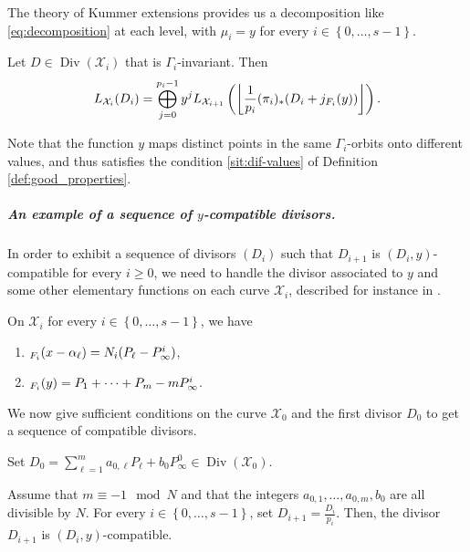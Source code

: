 \documentclass[a4paper,USenglish,autoref]{lipics-v2021}
\newcommand\floor[1]{\left\lfloor #1 \right\rfloor}
\DeclareMathOperator{\Div}{Div}
\let\div\relax\DeclareMathOperator{\div}{div}
\newcommand{\set}[1]{\left\{#1\right\}}
\newcommand{\range}[1]{\set{0,\dots,#1-1}}
\newcommand\calX{\mathcal{X}}
\begin{document}
The theory of Kummer extensions provides us a decomposition like \eqref{eq:decomposition} at each level, with $\mu_i=y$ for every $i\in\range{s}$.

\begin{theorem}[{\cite[Theorem 2.2]{M04}}]\label{th:M04}
	Let $D \in \Div(\calX_i)$ that is $\Gamma_i$-invariant. Then 
	\[L_{\calX_i}(D_i)=\bigoplus_{j=0}^{p_i-1}y^j L_{\calX_{i+1}}\left(\floor{\frac{1}{p_i}(\pi_i)_*(D_i+j\div_{F_i}(y))}\right).\]
\end{theorem}

Note that the function $y$ maps distinct points in the same $\Gamma_i$-orbits onto different values, and thus satisfies the condition \ref{sit:dif-values} of Definition \ref{def:good_properties}.

\subparagraph*{An example of a sequence of $y$-compatible divisors.}

In order to exhibit a sequence of divisors $(D_i)$ such that $D_{i+1}$ is $(D_i,y)$-compatible for every $i \geq 0$, we need to handle the divisor associated to $y$ and some other elementary functions on each curve $\calX_i$, described for instance in \cite{MQS15}.

\begin{lemma}
	On $\calX_i$ for every $i \in \range{s}$, we have
	\begin{enumerate}
		\item $\div_{F_i}(x-\alpha_\ell)=N_i(P_\ell-P^i_\infty)$,
		\item $\div_{F_i}(y)=P_1+\dots+P_m - m P_\infty^i$.
	\end{enumerate}  
\end{lemma}

We now give sufficient conditions on the curve $\calX_0$ and the first divisor $D_0$ to get a sequence of compatible divisors.

\begin{lemma}\label{lem:compatible-Kummer} Set $\displaystyle{D_0= \sum_{\ell=1}^m a_{0,\ell} P_\ell + b_0 P^0_\infty \in \Div(\calX_0)}$.
	
	Assume that $m \equiv -1 \mod N$ and that the integers $a_{0,1},\dots,a_{0,m},b_{0}$ are all divisible by $N$. For every $i \in \range{s}$, set $D_{i+1}=\frac{D_i}{p_i}$. Then, the divisor $D_{i+1}$ is $(D_i,y)$-compatible.
\end{lemma}
\end{document}
